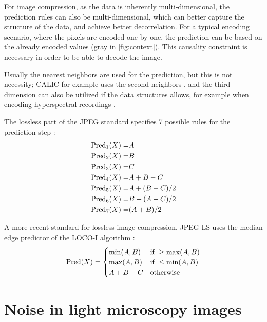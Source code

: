       For image compression, as the data is inherently multi-dimensional, the prediction rules can also be multi-dimensional, which can better capture the structure of the data, and achieve better decorrelation. For a typical encoding scenario, where the pixels are encoded one by one, the prediction can be based on the already encoded values (gray in \autoref{fig:context}). This causality constraint is necessary in order to be able to decode the image.

      Usually the nearest neighbors are used for the prediction, but this is not necessity; CALIC for example uses the second neighbors \cite{wu_context-based_1997}, and the third dimension can also be utilized if the data structures allows, for example when encoding hyperspectral recordings \cite{aranki_hardware_2009}.

      The lossless part of the JPEG standard specifies 7 possible rules for the prediction step \cite{pennebaker_jpeg:_1992}:
      \begin{align*}
        \operatorname{Pred}_1(X) =& A \\
        \operatorname{Pred}_2(X) =& B \\
        \operatorname{Pred}_3(X) =& C \\
        \operatorname{Pred}_4(X) =& A + B - C \\
        \operatorname{Pred}_5(X) =& A + (B - C)/2 \\
        \operatorname{Pred}_6(X) =& B + (A - C)/2 \\
        \operatorname{Pred}_7(X) =& (A + B)/2 \\
      \end{align*}

      A more recent standard for lossless image compression, JPEG-LS uses the median edge predictor of the LOCO-I algorithm \cite{weinberger_loco-i_2000}:
      \begin{equation}
        \operatorname{Pred}(X) = 
        \begin{cases}
          \min(A,B) & \text{if } \geq \max(A,B) \\
          \max(A,B) & \text{if } \leq \min(A,B) \\
          A + B - C & \text{otherwise }
        \end{cases}
      \end{equation}

  
  
  
  
  \section{Noise in light microscopy images}

